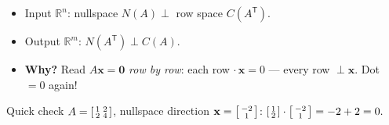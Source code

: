 \documentclass[aspectratio=169, 11pt]{beamer}
\newcommand{\xx}{\mathbf{x}}
\newcommand{\zero}{\mathbf{0}}
\newcommand{\T}{\mathsf{T}}
\begin{document}
\begin{frame}[t, plain]
  \begin{itemize}
    \setlength{\itemsep}{6pt}
    \item Input $\mathbb{R}^n$: \quad nullspace $N(A)\perp$ row space $C(A^{\T})$.
    \item Output $\mathbb{R}^m$: \quad $N(A^{\T})\perp C(A)$.
    \item \textbf{Why?} Read $A\xx=\zero$ \emph{row by row}: each row $\cdot\,\xx=0$ --- every row $\perp\xx$. Dot $=0$ again!
  \end{itemize}
  \vspace{4pt}
  \begin{block}{Quick check}
    $A=\begin{bsmallmatrix} 1 & 2\\ 2 & 4 \end{bsmallmatrix}$, nullspace direction $\xx=\begin{bsmallmatrix} -2\\1 \end{bsmallmatrix}$:
    \; $\begin{bsmallmatrix} 1\\2 \end{bsmallmatrix}\cdot\begin{bsmallmatrix} -2\\1 \end{bsmallmatrix}=-2+2=0.$ \checkmark
  \end{block}
\end{frame}
\end{document}
